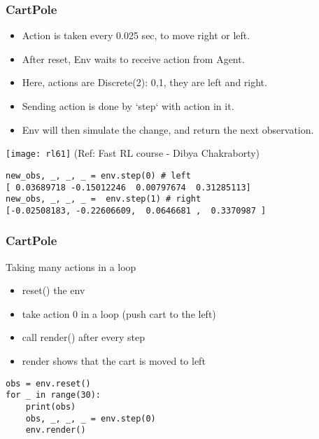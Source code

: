 \begin{frame}[fragile]\frametitle{CartPole}

\begin{itemize}
\item Action is taken every 0.025 sec, to move right or left.
\item After reset, Env waits to receive action from Agent.
\item Here, actions are Discrete(2): 0,1, they are left and right.
\item Sending action is done by `step` with action in it.
\item Env will then simulate the change, and return the next observation.
\end{itemize}

\begin{center}
\texttt{[image: rl61]}
{\tiny (Ref: Fast RL course - Dibya Chakraborty)}
\end{center}

\begin{lstlisting}
new_obs, _, _, _ = env.step(0) # left
[ 0.03689718 -0.15012246  0.00797674  0.31285113]
new_obs, _, _, _ =  env.step(1) # right
[-0.02508183, -0.22606609,  0.0646681 ,  0.3370987 ]
\end{lstlisting}


\end{frame}

\begin{frame}[fragile]\frametitle{CartPole}

Taking many actions in a loop

\begin{itemize}
\item reset() the env
\item take action 0 in a loop (push cart to the left)
\item call render() after every step
\item render shows that the cart is moved to left
\end{itemize}

\begin{lstlisting}
obs = env.reset()
for _ in range(30):
    print(obs)
    obs, _, _, _ = env.step(0)
    env.render()
\end{lstlisting}


\end{frame}

